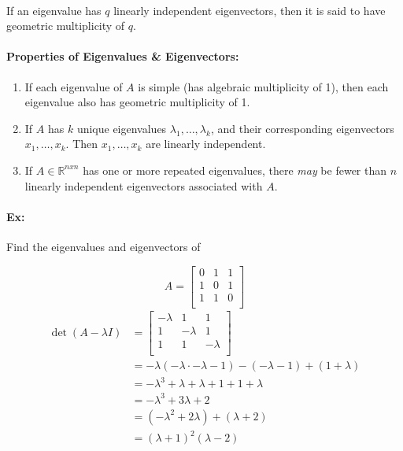 \documentclass{article}
\begin{document}
\paragraph{}If an eigenvalue has $q$ linearly independent eigenvectors, then it is said to have
geometric multiplicity of $q$.

\paragraph{Properties of Eigenvalues \& Eigenvectors:}

\begin{enumerate}
    \item If each eigenvalue of $A$ is simple (has algebraic multiplicity of 1), then each
        eigenvalue also has geometric multiplicity of 1.
    \item If $A$ has $k$ unique eigenvalues $\lambda_1, \ldots, \lambda_k$, and their corresponding 
        eigenvectors $x_1,\ldots, x_k$. Then $x_1, \ldots, x_k$ are linearly independent.
    \item If $A \in \mathbb{R}^{nxn}$ has one or more repeated eigenvalues, there \emph{may} be fewer
        than $n$ linearly independent eigenvectors associated with $A$.
\end{enumerate}

\paragraph{Ex:} Find the eigenvalues and eigenvectors of 


\[
A=
\begin{bmatrix}
    0 & 1& 1\\
    1& 0 & 1\\
    1 & 1 & 0\\
\end{bmatrix}
\]
\begin{align*}
    \det(A-\lambda I)&=
\begin{bmatrix}
    -\lambda & 1& 1\\
    1& -\lambda & 1\\
    1 & 1 & -\lambda\\
\end{bmatrix}\\
      &= -\lambda(-\lambda\cdot-\lambda - 1)-(-\lambda-1)+(1+\lambda)\\
      &= -\lambda^3 + \lambda + \lambda + 1 + 1 + \lambda\\
      &= -\lambda^3 + 3\lambda + 2\\
      &= (-\lambda^2 + 2\lambda) + (\lambda + 2)\\
      &= (\lambda+1)^2(\lambda-2)
\end{align*}
\end{document}
